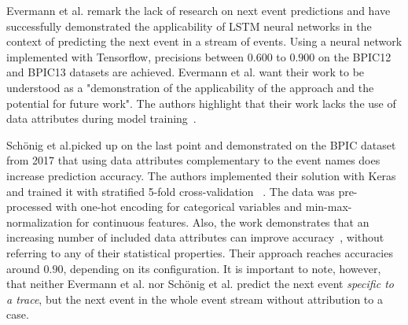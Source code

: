 Evermann et al. remark the lack of research on next event predictions and have successfully demonstrated the applicability of LSTM neural networks in the context of predicting the next event in a stream of events. Using a neural network implemented with Tensorflow, precisions between $0.600$ to $0.900$ on the BPIC12 and BPIC13 datasets are achieved. Evermann et al. want their work to be understood as a "demonstration of the applicability of the approach and the potential for future work". The authors highlight that their work lacks the use of data attributes during model training~\cite{evermann2016}.

Schönig et al.picked up on the last point and demonstrated on the BPIC dataset from 2017 that using data attributes complementary to the event names does increase prediction accuracy. The authors implemented their solution with Keras and trained it with stratified 5-fold cross-validation~\cite{schoenig2018} .
The data was pre-processed with one-hot encoding for categorical variables and min-max-normalization for continuous features. Also, the work demonstrates that an increasing number of included data attributes can improve accuracy~\cite[p.5]{schoenig2018}, without referring to any of their statistical properties. Their approach reaches accuracies around $0.90$, depending on its configuration. It is important to note, however, that neither Evermann et al. nor Schönig et al. predict the next event \textit{specific to a trace}, but the next event in the whole event stream without attribution to a case.

